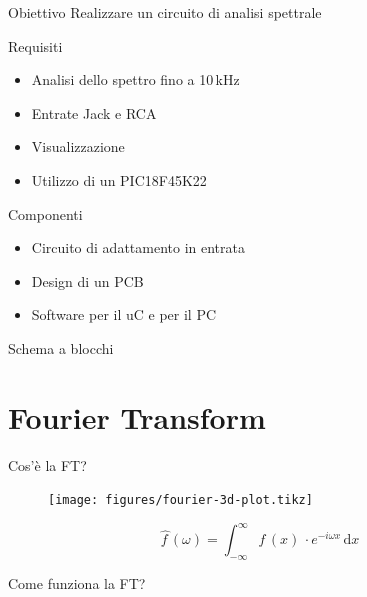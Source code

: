 \documentclass[10pt, xetex, handout]{beamer}
\newcommand{\dd}[1]{\mathrm{d}#1}
\begin{document}
\begin{frame}{Obiettivo}
    Realizzare un circuito di analisi spettrale
    \begin{block}{Requisiti}
    \begin{itemize}
        \item Analisi dello spettro fino a 10\,kHz
        \item Entrate Jack e RCA
        \item Visualizzazione 
        \item Utilizzo di un PIC18F45K22
    \end{itemize}
    \end{block}
    
    \pause
    \begin{block}{Componenti}
    \begin{itemize}
        \item Circuito di adattamento in entrata
        \item Design di un PCB
        \item Software per il uC e per il PC
    \end{itemize}
    \end{block}
\end{frame}

\begin{frame}{Schema a blocchi}
    \begin{figure} \centering
    \end{figure}
\end{frame}

\section{Fourier Transform}
\begin{frame}{Cos'\`e la FT?}
    \begin{figure} \centering
        \texttt{[image: figures/fourier-3d-plot.tikz]}
    \end{figure}
    \[
        \hat{f\,} (\omega) 
        = \int_{-\infty}^\infty f\,(x)\,\cdot e^{-i\omega x}\,\dd{x}
    \]
\end{frame}

\begin{frame}{Come funziona la FT?}
\end{frame}
\end{document}
